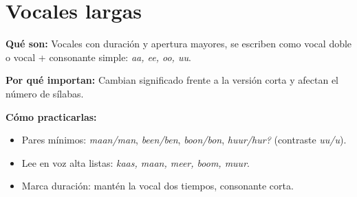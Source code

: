 \section{Vocales largas}
\textbf{Qué son:} Vocales con duración y apertura mayores, se escriben como vocal doble o vocal + consonante simple: \textit{aa, ee, oo, uu}.

\textbf{Por qué importan:} Cambian significado frente a la versión corta y afectan el número de sílabas.

\textbf{Cómo practicarlas:}
\begin{itemize}[leftmargin=*]
  \item Pares mínimos: \textit{maan/man}, \textit{been/ben}, \textit{boon/bon}, \textit{huur/hur?} (contraste \textit{uu/u}).
  \item Lee en voz alta listas: \textit{kaas, maan, meer, boom, muur}.
  \item Marca duración: mantén la vocal dos tiempos, consonante corta.
\end{itemize}
